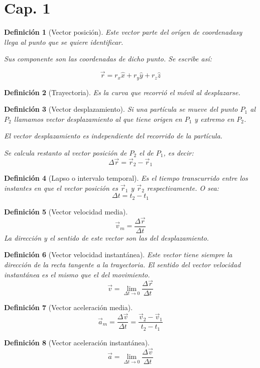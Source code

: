 \documentclass[12pt,a4paper]{article}
\newtheorem{mydef}{Definici\'on}[section]
\begin{document}
\section{Cap. 1}

\begin{mydef}[Vector posici\'on]
Este vector parte del or\'igen de coordenadasy llega al punto que
se quiere identificar.

Sus componente son las coordenadas de dicho punto. Se escribe as\'i:

\[ \vec{r}= r_x \hat{x} + r_y \hat{y} + r_z \hat{z} \]

\end{mydef}
\begin{mydef}[Trayectoria]
Es la curva que recorri\'o el m\'ovil al desplazarse.
\end{mydef}

\begin{mydef}[Vector desplazamiento]
Si una part\'icula se mueve del punto \(P_1\) al \(P_2\) llamamos
\emph{vector desplazamiento} al que tiene origen en \(P_1\) y extremo
en \(P_2\).

El vector desplazamiento es independiente del recorrido de la
part\'icula.

Se calcula restanto al vector posici\'on de \(P_2\) el de \(P_1\), es
decir:
\[ \Delta \vec{r} = \vec{r}_2 - \vec{r}_1 \]
\end{mydef}
\begin{mydef}[Lapso o intervalo temporal]
Es el tiempo transcurrido  entre los instantes en que el vector
posici\'on es \(\vec{r}_1\) y  \( \vec{r}_2\) respectivamente. O sea:
\[\Delta t = t_2 - t_1\]
\end{mydef}
\begin{mydef}[Vector velocidad media]
\[ \vec{v}_m = \frac{\Delta \vec{r}}{\Delta t } \]
La direcci\'on y el sentido de este vector son las del desplazamiento.
\end{mydef}
\begin{mydef}[Vector velocidad instant\'anea]
Este vector tiene siempre la direcci\'on de la recta tangente a la
trayectoria.
El sentido del vector velocidad instant\'anea es el mismo que el del
movimiento.
\[ \vec{v} = \lim_{\Delta t \to 0} \frac{\Delta \vec{r}}{\Delta t} \]
\end{mydef}
\begin{mydef}[Vector aceleraci\'on media]
\[ \vec{a}_m =  \frac{\Delta \vec{v}}{\Delta t} = \frac{\vec{v}_2 -
  \vec{v}_1}{t_2 - t_1} \]
\end{mydef}
\begin{mydef}[Vector aceleraci\'on instant\'anea]
\[ \vec{a} = \lim_{\Delta t \to 0} \frac{\Delta \vec{v}}{\Delta t} 
 \]
\end{mydef}
\end{document}
